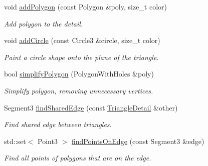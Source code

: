 \begin{DoxyCompactItemize}
void \mbox{\hyperlink{classpepr3d_1_1_triangle_detail_a5a7bf09704143a299bb2d6261d540729}{add\+Polygon}} (const Polygon \&poly, size\+\_\+t color)
\begin{DoxyCompactList}\small\item\em Add polygon to the detail. \end{DoxyCompactList}\item 
\mbox{\label{classpepr3d_1_1_triangle_detail_aaa392bd7784c8509a4ba0e1ab162c589}} 
void \mbox{\hyperlink{classpepr3d_1_1_triangle_detail_aaa392bd7784c8509a4ba0e1ab162c589}{add\+Circle}} (const Circle3 \&circle, size\+\_\+t color)
\begin{DoxyCompactList}\small\item\em Paint a circle shape onto the plane of the triangle. \end{DoxyCompactList}\item 
bool \mbox{\hyperlink{classpepr3d_1_1_triangle_detail_a81abca51b11ad6aa0664053c8e427e56}{simplify\+Polygon}} (Polygon\+With\+Holes \&poly)
\begin{DoxyCompactList}\small\item\em Simplify polygon, removing unnecessary vertices. \end{DoxyCompactList}\item 
\mbox{\label{classpepr3d_1_1_triangle_detail_a4e04c9ef44eb6d48dacce49e547ba190}} 
Segment3 \mbox{\hyperlink{classpepr3d_1_1_triangle_detail_a4e04c9ef44eb6d48dacce49e547ba190}{find\+Shared\+Edge}} (const \mbox{\hyperlink{classpepr3d_1_1_triangle_detail}{Triangle\+Detail}} \&other)
\begin{DoxyCompactList}\small\item\em Find shared edge between triangles. \end{DoxyCompactList}\item 
\mbox{\label{classpepr3d_1_1_triangle_detail_a3d8d23f8835e264356b503cc495c71e4}} 
std\+::set$<$ Point3 $>$ \mbox{\hyperlink{classpepr3d_1_1_triangle_detail_a3d8d23f8835e264356b503cc495c71e4}{find\+Points\+On\+Edge}} (const Segment3 \&edge)
\begin{DoxyCompactList}\small\item\em Find all points of polygons that are on the edge. \end{DoxyCompactList}\item 

\end{DoxyCompactItemize}

